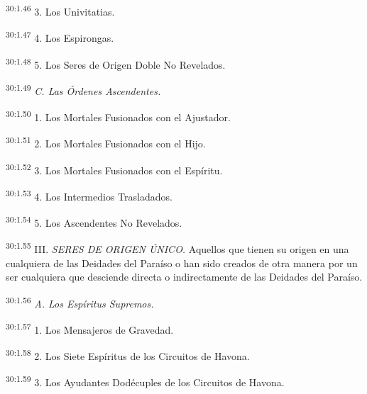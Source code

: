 \par
\textsuperscript{30:1.46} 3. Los Univitatias.

\par
\textsuperscript{30:1.47} 4. Los Espirongas.

\par
\textsuperscript{30:1.48} 5. Los Seres de Origen Doble No Revelados.

\par
\textsuperscript{30:1.49} \textit{C. Las Órdenes Ascendentes.}

\par
\textsuperscript{30:1.50} 1. Los Mortales Fusionados con el Ajustador.

\par
\textsuperscript{30:1.51} 2. Los Mortales Fusionados con el Hijo.

\par
\textsuperscript{30:1.52} 3. Los Mortales Fusionados con el Espíritu.

\par
\textsuperscript{30:1.53} 4. Los Intermedios Trasladados.

\par
\textsuperscript{30:1.54} 5. Los Ascendentes No Revelados.

\par
\textsuperscript{30:1.55} III. \textit{SERES DE ORIGEN ÚNICO.} Aquellos que tienen su origen en una cualquiera de las Deidades del Paraíso o han sido creados de otra manera por un ser cualquiera que desciende directa o indirectamente de las Deidades del Paraíso.

\par
\textsuperscript{30:1.56} \textit{A. Los Espíritus Supremos.}

\par
\textsuperscript{30:1.57} 1. Los Mensajeros de Gravedad.

\par
\textsuperscript{30:1.58} 2. Los Siete Espíritus de los Circuitos de Havona.

\par
\textsuperscript{30:1.59} 3. Los Ayudantes Dodécuples de los Circuitos de Havona.


